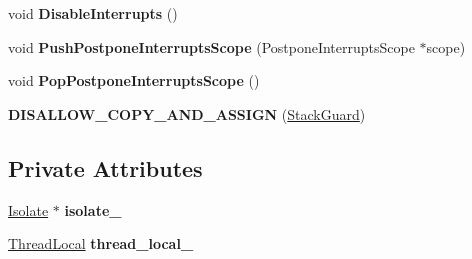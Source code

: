 \begin{DoxyCompactItemize}
\item 
void {\bfseries Disable\+Interrupts} ()\hypertarget{classv8_1_1internal_1_1_stack_guard_af14f713892243b8a890005bd48ea8401}{}\label{classv8_1_1internal_1_1_stack_guard_af14f713892243b8a890005bd48ea8401}

\item 
void {\bfseries Push\+Postpone\+Interrupts\+Scope} (Postpone\+Interrupts\+Scope $\ast$scope)\hypertarget{classv8_1_1internal_1_1_stack_guard_a5db3c61e5228e12d8937792b53fe4282}{}\label{classv8_1_1internal_1_1_stack_guard_a5db3c61e5228e12d8937792b53fe4282}

\item 
void {\bfseries Pop\+Postpone\+Interrupts\+Scope} ()\hypertarget{classv8_1_1internal_1_1_stack_guard_ae301a3d76d8567325d80a6f235a8b6f1}{}\label{classv8_1_1internal_1_1_stack_guard_ae301a3d76d8567325d80a6f235a8b6f1}

\item 
{\bfseries D\+I\+S\+A\+L\+L\+O\+W\+\_\+\+C\+O\+P\+Y\+\_\+\+A\+N\+D\+\_\+\+A\+S\+S\+I\+GN} (\hyperlink{classv8_1_1internal_1_1_stack_guard}{Stack\+Guard})\hypertarget{classv8_1_1internal_1_1_stack_guard_a6bc4a818a0ba2d88b49345b5ac690dd1}{}\label{classv8_1_1internal_1_1_stack_guard_a6bc4a818a0ba2d88b49345b5ac690dd1}

\end{DoxyCompactItemize}
\subsection*{Private Attributes}
\begin{DoxyCompactItemize}
\item 
\hyperlink{classv8_1_1internal_1_1_isolate}{Isolate} $\ast$ {\bfseries isolate\+\_\+}\hypertarget{classv8_1_1internal_1_1_stack_guard_a022e169dbb52a0c1d1a5a3b6596070b1}{}\label{classv8_1_1internal_1_1_stack_guard_a022e169dbb52a0c1d1a5a3b6596070b1}

\item 
\hyperlink{classv8_1_1internal_1_1_stack_guard_1_1_thread_local}{Thread\+Local} {\bfseries thread\+\_\+local\+\_\+}\hypertarget{classv8_1_1internal_1_1_stack_guard_a86006e53263d51a22e4c5daee8b5e80b}{}\label{classv8_1_1internal_1_1_stack_guard_a86006e53263d51a22e4c5daee8b5e80b}

\end{DoxyCompactItemize}
